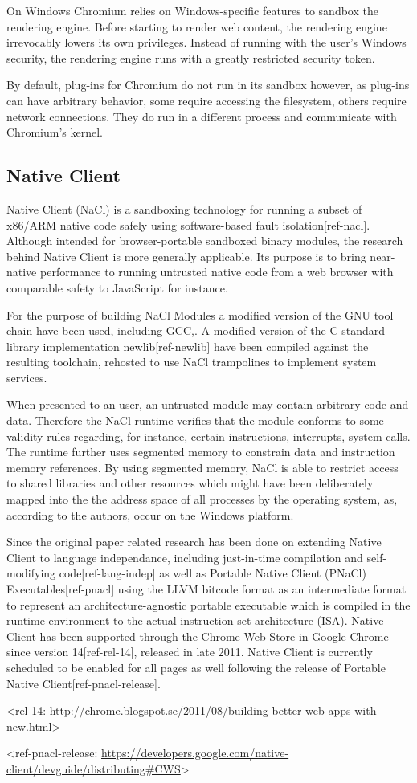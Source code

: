 On Windows Chromium relies on Windows-specific features to sandbox the rendering
engine. Before starting to render web content, the rendering engine irrevocably
lowers its own privileges. Instead of running with the user's Windows security,
the rendering engine runs with a greatly restricted security token.

By default, plug-ins for Chromium do not run in its sandbox however, as
plug-ins can have arbitrary behavior, some require accessing the filesystem,
others require network connections. They do run in a different process and
communicate with Chromium's kernel.

\subsection {Native Client}

Native Client (NaCl) is a sandboxing technology for running a subset of x86/ARM
native code safely using software-based fault isolation[ref-nacl]. Although
intended for browser-portable sandboxed binary modules, the research behind
Native Client is more generally applicable. Its purpose is to bring near-native
performance to running untrusted native code from a web browser with comparable
safety to JavaScript for instance.

For the purpose of building NaCl Modules a modified version of the GNU tool
chain have been used, including GCC,. A modified version of the
C-standard-library implementation newlib[ref-newlib] have been compiled against
the resulting toolchain, rehosted to use NaCl trampolines to implement system
services.

When presented to an user, an untrusted module may contain arbitrary code and
data. Therefore the NaCl runtime verifies that the module conforms to some
validity rules regarding, for instance, certain instructions, interrupts, system
calls. The runtime further uses segmented memory to constrain data and
instruction memory references. By using segmented memory, NaCl is able to
restrict access to shared libraries and other resources which might have been
deliberately mapped into the the address space of all processes by the operating
system, as, according to the authors, occur on the Windows platform.

Since the original paper related research has been done on extending Native
Client to language independance, including just-in-time compilation
and self-modifying code[ref-lang-indep] as well as Portable Native Client
(PNaCl) Executables[ref-pnacl] using the LLVM bitcode format as an intermediate
format to represent an architecture-agnostic portable executable which is
compiled in the runtime environment to the actual instruction-set architecture
(ISA). Native Client has been supported through the Chrome Web Store in Google
Chrome since version 14[ref-rel-14], released in late 2011. Native Client is
currently scheduled to be enabled for all pages as well following the release of
Portable Native Client[ref-pnacl-release].

<rel-14: \url{http://chrome.blogspot.se/2011/08/building-better-web-apps-with-new.html}>

<ref-pnacl-release: \url{https://developers.google.com/native-client/devguide/distributing#CWS}>
